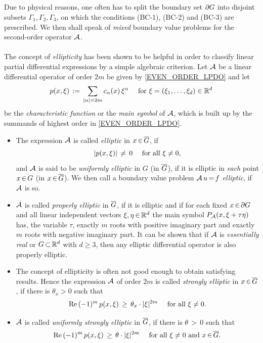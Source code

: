 \documentclass[11pt,twoside]{article}
\def\G{G}
\begin{document}
\subparagraph{}
Due to physical reasons,
one often has to split the boundary set $\bndG$
into disjoint subsets $\Gamma_1,\Gamma_2,\Gamma_3$,
on which the conditions (BC-1), (BC-2) and (BC-3) are prescribed.
We then shall speak of \textit{mixed} boundary value problems
for the second-order operator ${\mathcal{A}}$.

\paragraph{} %
The concept of \textit{ellipticity} has been shown to be helpful in order
to classify linear partial differential expressions
by a simple algebraic criterion.
Let ${\mathcal{A}}$ be a linear differential operator of order $2m$ be given
by \eqref{EVEN_ORDER_LPDO} and let
\[
p(x,\xi) \eqdef \sum_{\abs{\alpha} = 2m} c_{\alpha}(x) \, \xi^{\alpha}
\quad \for \xi = (\xi_1,\ldots,\xi_d) \in \Rd
\]
be the \textit{characteristic function} or the \textit{main symbol} of ${\mathcal{A}}$,
which is built up by the summands of highest order in \eqref{EVEN_ORDER_LPDO}.

\begin{itemize}[leftmargin=10mm]
\item[(E-1)]
The expression ${\mathcal{A}}$ is called \textit{elliptic} in $x \xeof \clG$,
if
\[
\abs{p(x,\xi)} \, \neq \, 0 \qfa \xi \neq 0,
\]
and ${\mathcal{A}}$ is said to be \textit{uniformly elliptic} in $\G$ (in $\clG$),
if it is elliptic in \textit{each} point $x \xeof \G$ (in $x \xeof \clG$).
We then call a boundary value problem ${\mathcal{A}} \,u {\,=\,} f$ \textit{elliptic},
if ${\mathcal{A}}$ is so.

\item[(E-2)]
${\mathcal{A}}$ is called \textit{properly elliptic} in $\clG$,
if it is elliptic and 
if for each fixed $x \xeof \bndG$ and all linear independent vectors
$\xi, \eta {\,\in\,} {\mathbb{R}}^d$ the main symbol $P_{{\mathcal{A}}}(x, \xi + \tau \eta)$ has,
{\wrt} the variable $\tau$,
exactly $m$ roots with positive imaginary part and
exactly $m$ roots with negative imaginary part.
It can be shown that
if ${\mathcal{A}}$ is \textit{essentially real} or $\G \xsubset \Rd$ with $d \geq 3$,
then any elliptic differential operator is also {properly elliptic}.

\item[(E-3)]
The concept of ellipticity is often not good enough
to obtain satisfying results.
Hence the expression ${\mathcal{A}}$ of order $2m$
is called \textit{strongly elliptic} in $x \xeof \clG$,
if there is $\theta_x> 0$ such that
\[
\re \, (-1)^m \, p(x,\xi)
\, \geq \,
\theta_x \cdot \abs{\xi} ^{2m}
\quad
\fa \xi \neq 0.
\]

\item[(E-4)]
${\mathcal{A}}$ is called \textit{uniformly strongly elliptic} in $\clG$,
if there is $\theta {\,>\,} 0$ such that 
\[
\re \, (-1)^m \, p(x,\xi)
\, \geq \,
\theta \cdot \abs{\xi} ^{2m}
\quad
\fa \xi \neq 0 \and x \xeof \clG.
\]
\end{itemize}
\end{document}
